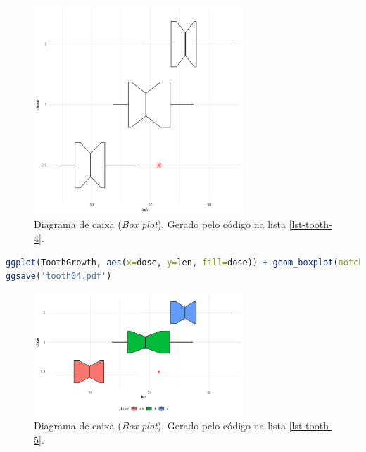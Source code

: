 \begin{frame}
\begin{figure}[h]
 \centering
  \includegraphics[width=0.7\textwidth,height=0.7\textheight,keepaspectratio]{figures/tooth03.pdf}
 \caption{Diagrama de caixa (\emph{Box plot}). Gerado pelo código na lista \ref{lst-tooth-4}.}
 \label{fig-tooth03}
\end{figure}

\framebreak

\begin{lstlisting}[language=R, label=lst-tooth-5, caption={Box plot.}, postbreak=\mbox{$\hookrightarrow$\space}, basicstyle=\fontsize{8}{10}\selectfont\ttfamily]
ggplot(ToothGrowth, aes(x=dose, y=len, fill=dose)) + geom_boxplot(notch=TRUE, outlier.colour="red", outlier.size=2) + coord_flip() + theme_minimal() + theme(legend.position="bottom")
ggsave('tooth04.pdf')
\end{lstlisting}

\begin{figure}[h]
 \centering
  \includegraphics[width=0.7\textwidth,height=0.7\textheight,keepaspectratio]{figures/tooth04.pdf}
 \caption{Diagrama de caixa (\emph{Box plot}). Gerado pelo código na lista \ref{lst-tooth-5}.}
 \label{fig-tooth04}
\end{figure}


\end{frame}
